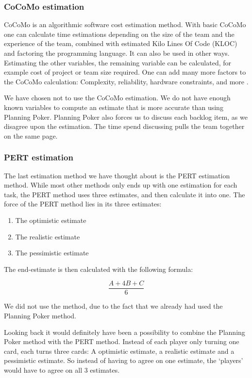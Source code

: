 \subsubsection{CoCoMo estimation}
CoCoMo is an algorithmic software cost estimation method. With basic CoCoMo one can calculate time estimations depending on the size of the team and the experience of the team, combined with estimated Kilo Lines Of Code (KLOC) and factoring the programming language. It can also be used in other ways. Estimating the other variables, the remaining variable can be calculated, for example cost of project or team size required. One can add many more factors to the CoCoMo calculation: Complexity, reliability, hardware constraints, and more \cite[p. ?]{?}.

We have chosen not to use the CoCoMo estimation. We do not have enough known variables to compute an estimate that is more accurate than using Planning Poker. Planning Poker also forces us to discuss each backlog item, as we disagree upon the estimation. The time spend discussing pulls the team together on the same page. 

\subsubsection{PERT estimation}
The last estimation method we have thought about is the PERT estimation method. While most other methods only ends up with one estimation for each task, the PERT method uses three estimates, and then calculate it into one. The force of the PERT method lies in its three estimates:

\begin{enumerate}[label=\Alph{*}\hspace{0.8em}]
	\item The optimistic estimate
	\item The realistic estimate
	\item The pessimistic estimate
\end{enumerate}

The end-estimate is then calculated with the  following formula:

\begin{equation}
	\frac{A+4B+C}{6}
\end{equation}

We did not use the method, due to the fact that we already had used the Planning Poker method.

Looking back it would definitely have been a possibility to combine the Planning Poker method with the PERT method. Instead of each player only turning one card, each turns three cards: A optimistic estimate, a realistic estimate and a pessimistic estimate. So instead of having to agree on one estimate, the `players' would have to agree on all 3 estimates.
